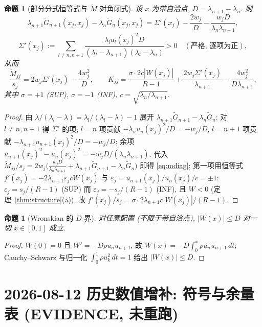 \documentclass[UTF8]{ctexart}
\newtheorem{proposition}[theorem]{命题}
\begin{document}
\begin{proposition}[部分分式恒等式与 $\tilde M$ 对角闭式]\label{prop:pf}
设 $x$ 为带自洽点, $D=\lambda_{n+1}-\lambda_n$. 则
\begin{equation}\label{eq:pf}
	\lambda_{n+1}\tilde G_{n+1}(x_j,x_j)-\lambda_n\tilde G_n(x_j,x_j)
	=\Sigma'(x_j)-\frac{2w_j}{D}-\frac{w_jD}{\lambda_n\lambda_{n+1}},
\end{equation}
\begin{equation*}
	\Sigma'(x_j):=\sum_{l\ne n,n+1}
	\frac{\lambda_l u_l(x_j)^2D}{(\lambda_l-\lambda_{n+1})(\lambda_l-\lambda_n)}>0
	\quad(\text{严格, 逐项为正}),
\end{equation*}
从而
\begin{equation}\label{eq:mdiag}
	\frac{\tilde M_{jj}}{s_j}=2w_j\Sigma'(x_j)-\frac{4w_j^2}{D},
	\qquad
	K_{jj}=\frac{\sigma\cdot 2c|W(x_j)|}{R-1}
	+\frac{2w_j\Sigma'(x_j)}{\lambda_{n+1}}
	-\frac{4w_j^2}{D\lambda_{n+1}},
\end{equation}
其中 $\sigma=+1$ (SUP), $\sigma=-1$ (INF), $c=\sqrt{\lambda_n/\lambda_{n+1}}$.
\end{proposition}
\begin{proof}
由 $\lambda/(\lambda_l-\lambda)=\lambda_l/(\lambda_l-\lambda)-1$ 展开
$\lambda_{n+1}\tilde G_{n+1}-\lambda_n\tilde G_n$: 对 $l\ne n,n+1$ 得
$\Sigma'$ 的项; $l=n$ 项贡献 $-\lambda_nu_n(x_j)^2/D=-w_j/D$,
$l=n+1$ 项贡献 $-\lambda_{n+1}u_{n+1}(x_j)^2/D=-w_j/D$; 余项
$u_{n+1}(x_j)^2-u_n(x_j)^2=-w_jD/(\lambda_n\lambda_{n+1})$. 代入
$\tilde M_{jj}/s_j=2w_j\bigl(\frac{w_jD}{\lambda_n\lambda_{n+1}}
+\lambda_{n+1}\tilde G_{n+1}-\lambda_n\tilde G_n\bigr)$
即得 \eqref{eq:mdiag}; 第一项用恒等式
$f'(x_j)=-2\lambda_{n+1}\varepsilon_jcW(x_j)$ 与
$\varepsilon_j=u_{n+1}(x_j)/u_n(x_j)/c=\pm1$:
$\varepsilon_j=s_j/(R-1)$ (SUP) 而 $\varepsilon_j=-s_j/(R-1)$ (INF),
且 $W<0$ (定理~\ref{thm:structure}(a)), 故
$f'(x_j)/s_j=\sigma\cdot 2\lambda_{n+1}c|W(x_j)|/(R-1)$.
\end{proof}

\begin{proposition}[Wronskian 的 $D$ 界]\label{prop:Wbound}
对任意配置 (不限于带自洽点), $|W(x)|\le D$ 对一切 $x\in[0,1]$ 成立.
\end{proposition}
\begin{proof}
$W(0)=0$ 且 $W'=-D\rho u_nu_{n+1}$, 故
$W(x)=-D\int_0^x\rho u_nu_{n+1}\,dt$; Cauchy--Schwarz 与归一化
$\int_0^1\rho u_k^2\,dt=1$ 给出 $|W(x)|\le D$.
\end{proof}

\section{2026-08-12 历史数值增补: 符号与余量表 (EVIDENCE, 未重跑)}\label{sec:aug-ev}
\end{document}
